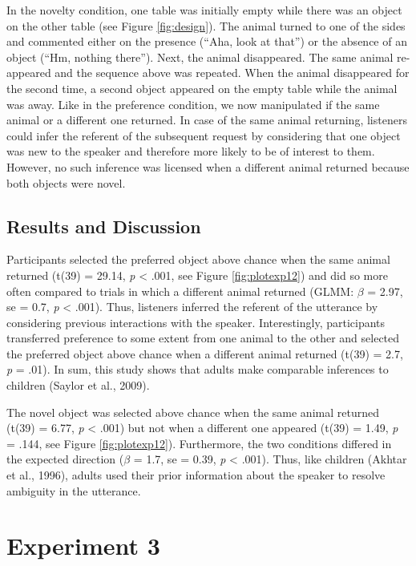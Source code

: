 \documentclass[10pt, letterpaper]{article}
\begin{document}
In the novelty condition, one table was initially empty while there was
an object on the other table (see Figure \ref{fig:design}). The animal
turned to one of the sides and commented either on the presence (``Aha,
look at that'') or the absence of an object (``Hm, nothing there'').
Next, the animal disappeared. The same animal re-appeared and the
sequence above was repeated. When the animal disappeared for the second
time, a second object appeared on the empty table while the animal was
away. Like in the preference condition, we now manipulated if the same
animal or a different one returned. In case of the same animal
returning, listeners could infer the referent of the subsequent request
by considering that one object was new to the speaker and therefore more
likely to be of interest to them. However, no such inference was
licensed when a different animal returned because both objects were
novel.

\subsection{Results and Discussion}\label{results-and-discussion-1}

Participants selected the preferred object above chance when the same
animal returned (t(39) = 29.14, \emph{p} \textless{} .001, see Figure
\ref{fig:plotexp12}) and did so more often compared to trials in which a
different animal returned (GLMM: \(\beta\) = 2.97, se = 0.7, \emph{p}
\textless{} .001). Thus, listeners inferred the referent of the
utterance by considering previous interactions with the speaker.
Interestingly, participants transferred preference to some extent from
one animal to the other and selected the preferred object above chance
when a different animal returned (t(39) = 2.7, \emph{p} = .01). In sum,
this study shows that adults make comparable inferences to children
(Saylor et al., 2009).

The novel object was selected above chance when the same animal returned
(t(39) = 6.77, \emph{p} \textless{} .001) but not when a different one
appeared (t(39) = 1.49, \emph{p} = .144, see Figure
\ref{fig:plotexp12}). Furthermore, the two conditions differed in the
expected direction (\(\beta\) = 1.7, se = 0.39, \emph{p} \textless{}
.001). Thus, like children (Akhtar et al., 1996), adults used their
prior information about the speaker to resolve ambiguity in the
utterance.

\section{Experiment 3}\label{experiment-3}
\end{document}
